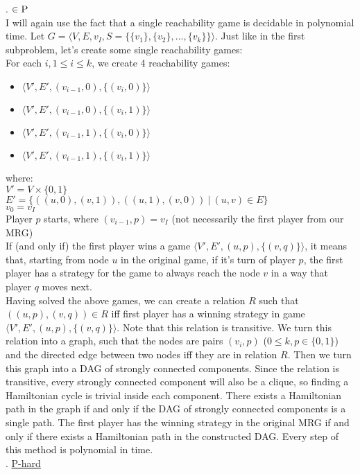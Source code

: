 . \underline{$\in \textsc{P}$}\\
I will again use the fact that a single reachability game is decidable in polynomial time.
Let $G = \langle V, E, v_I, S = \{ \{v_1\}, \{v_2\}, ..., \{v_k\} \}\rangle$. Just like in the first
subproblem, let's create some single reachability games:\\
For each $i, 1 \leq i \leq k$, we create 4 reachability games:
\begin{itemize}
      \item $\langle V', E', (v_{i-1}, 0), \{ (v_i, 0) \} \rangle$
      \item $\langle V', E', (v_{i-1}, 0), \{ (v_i, 1) \} \rangle$
      \item $\langle V', E', (v_{i-1}, 1), \{ (v_i, 0) \} \rangle$
      \item $\langle V', E', (v_{i-1}, 1), \{ (v_i, 1) \} \rangle$
\end{itemize}
where:\\
$V' = V \times \{0,1\}$\\
$E' = \{ ((u,0), (v,1)), ((u,1),(v,0)) \ |\ (u, v) \in E \}$\\
$v_0 = v_I$\\
Player $p$ starts, where $(v_{i-1}, p) = v_I$ (not necessarily the first player from our MRG)\\

\noindent
If (and only if) the first player wins a game $\langle V', E', (u, p), \{ (v, q) \} \rangle$, it means that,
starting from node $u$ in the original game, if it's turn of player $p$, the first player has a strategy
for the game to always reach the node $v$ in a way that player $q$ moves next.\\
Having solved the above games, we can create a relation $R$ such that $((u, p), (v, q)) \in R$ iff
first player has a winning strategy in game $\langle V', E', (u, p), \{ (v, q) \} \rangle$.
Note that this relation is transitive. We turn this relation into a graph, such that the nodes
are pairs $(v_i, p)$ ($0 \leq k, p \in \{0, 1\}$) and the directed edge between two nodes iff they
are in relation $R$. Then we turn this graph into a DAG of strongly connected components.
Since the relation is transitive, every strongly connected component will also be a clique, so finding
a Hamiltonian cycle is trivial inside each component. There exists a Hamiltonian path in the graph if and only if
the DAG of strongly connected components is a single path. The first player has the winning strategy in the
original MRG if and only if there exists a Hamiltonian path in the constructed DAG.
Every step of this method is polynomial in time.\\

. \underline{P-hard}\\
